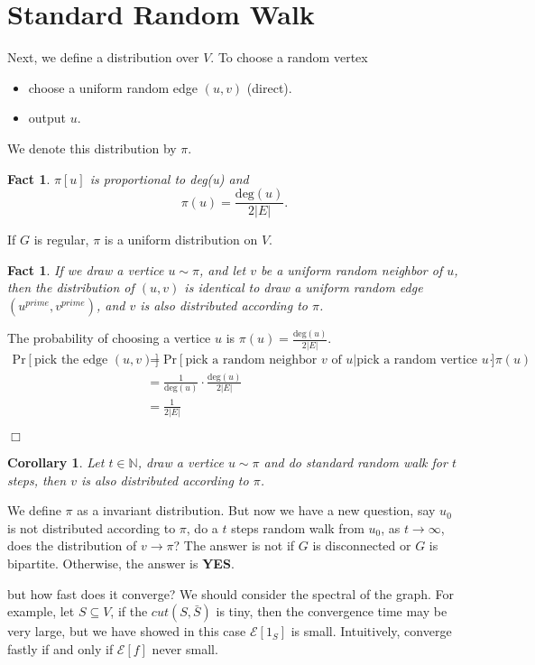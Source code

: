 \documentclass{article}
\newtheorem{corollary}[theorem]{Corollary}
\newtheorem{fact}[theorem]{Fact}
\newenvironment{proof}{\noindent{\bf Proof:} \hspace*{1mm}}{
	\hspace*{\fill} $\Box$ }
\begin{document}
\section{Standard Random Walk}
Next, we define a distribution over $V$. To choose a random vertex
\begin{itemize}
  \item choose a uniform random edge $(u, v)$ (direct).
  \item output $u$.
\end{itemize}
We denote this distribution by $\pi$.
\begin{fact}
  $\pi[u]$ is proportional to deg(u) and 
  $$\pi(u) = \frac{\text{deg}(u)}{2|E|}.$$
\end{fact}
If $G$ is regular, $\pi$ is a uniform distribution on $V$.
\begin{fact}
  If we draw a vertice $u \sim \pi$, and let $v$ be a uniform random neighbor of $u$, then the distribution of $(u, v)$ is identical to draw a uniform random edge $(u^{prime}, v^{prime})$, and $v$ is also distributed according to $\pi$.
\end{fact}
\begin{proof}
  The probability of choosing a vertice $u$ is $\pi(u) = \frac{\text{deg}(u)}{2\left|E\right|}$. 
  \begin{align*}
    \text{Pr}\left[\text{pick the edge }(u,v)\right] &= \text{Pr}\left[\text{pick a random neighbor } v \text{ of } u \text{|pick a random vertice } u \right] \cdot \pi(u)\\
    &= \frac{1}{\text{deg}(u)} \cdot \frac{\text{deg}(u)}{2|E|}\\
    &= \frac{1}{2|E|}
  \end{align*}
  
\end{proof}
\begin{corollary}
  Let $t \in \mathbb{N}$, draw a vertice $u \sim \pi$ and do standard random walk for $t$ steps, then $v$ is also distributed according to $\pi$.
\end{corollary}
We define $\pi$ as a invariant distribution. But now we have a new question, say $u_{0}$ is not distributed according to $\pi$, do a $t$ steps random walk from $u_{0}$, as $t \rightarrow \infty$, does the distribution of $v \rightarrow \pi$? The answer is not if $G$ is disconnected or $G$ is bipartite. Otherwise, the answer is \textbf{YES}.
\par but how fast does it converge? We should consider the spectral of the graph. For example, let $S \subseteq V$, if the $cut(S, \bar{S})$ is tiny, then the convergence time may be very large, but we have showed in this case $\mathcal{E}[1_{S}]$ is small. Intuitively, converge fastly if and only if $\mathcal{E}[f]$ never small.
\end{document}
